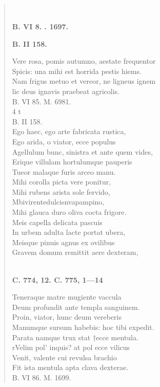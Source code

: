 \documentclass[11pt, a4paper]{report}
\begin{document}
            \subsection*{}
      \begin{verse}
        ﻿\pagebreak 
    \begin{center} \textbf{B. VI 8. . 1697.} \end{center} \marginpar{[40]} \begin{center} \textbf{B. II 158.} \end{center}Vere rosa, pomis autumno, aestate frequentor \\ Spicis: una mihi est horrida pestis hiems. \\ Nam frigus metuo et vereor, ne ligneus ignem \\ lic deus ignavis praebeat agricolis. \\ B. VI 85. M. 6981. \\ 4 t \\ B. II 158. \\ Ego haec, ego arte fabricata rustica, \\ Ego arida, o viator, ecce populus \\ Agellulum bunc, sinistra et ante quem vides, \\ Erique villulam hortulumque pauperis \\ Tueor malaque furis arceo manu. \\ Mihi corolla picta vere ponitur, \\ Mihi rubens arista sole fervido, \\ Mbivirentedulcisnvapampino, \\ Mihi glauca duro oliva cocta frigore. \\ Meis capella delicata pascuis \\ In urbem adulta lacte portat ubera, \\ Meisque pinuis agnus ex ovilibus \\ Gravem domum remittit aere dexteram, \\ 
        ﻿\pagebreak 
    \begin{center} \textbf{C. 774, 12. C. 775, 1—14} \end{center} \marginpar{[260]} Teneraque matre mugiente vaccula \\ Deum profundit ante templa sanguinem. \\ Proin, viator, hunc deum vereberis \\ Manumque sursum habebis: hoc tibi expedit. \\ Parata namque trux stat  \lbrack †ecce \rbrack  mentula. \\ rVelim pol’ inquis? at pol ecce vilicus \\ Venit, valente cui revulsa brachio \\ Fit ista mentula apta clava dexterae. \\ B. VI 86. M. 1699. \\ 
      \end{verse}
  
\end{document}
